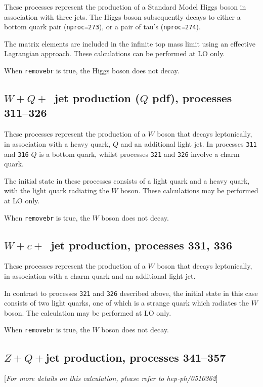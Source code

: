 \documentclass[12pt]{article}
\begin{document}
These processes represent the production of a Standard Model Higgs boson
in association with three jets. The Higgs boson
subsequently decays to either a bottom quark pair ({\tt nproc=273}), 
or a pair of tau's ({\tt nproc=274}).

The matrix elements are included in the infinite top mass limit
using an effective Lagrangian approach. These calculations can be
performed at LO only.

When {\tt removebr} is true, the Higgs boson does not decay.

\subsection{$W+Q+$~jet production ($Q$ pdf), processes 311--326}
\label{subsec:wQj}

These processes represent the production of a $W$
boson that decays leptonically,
in association with a heavy quark, $Q$ and an additional light jet. In
processes {\tt 311} and {\tt 316} $Q$ is a bottom quark, whilst
processes {\tt 321} and {\tt 326} involve a charm quark.

The initial state in these processes consists of a light quark and a heavy 
quark, with the light quark radiating the $W$ boson. These calculations may
be performed at LO only.

When {\tt removebr} is true, the $W$ boson does not decay.

\subsection{$W+c+$~jet production, processes 331, 336}
\label{subsec:wcj}

These processes represent the production of a $W$
boson that decays leptonically,
in association with a charm quark and an additional light jet. 

In contrast to processes {\tt 321} and {\tt 326} described above, the initial
state in this case consists of two light quarks, one of which is a
strange quark which radiates the $W$ boson. The calculation may
be performed at LO only.

When {\tt removebr} is true, the $W$ boson does not decay.

\subsection{$Z+Q+$jet production, processes 341--357}
\label{subsec:ZQj}

\begin{center}
[{\it For more details on this calculation, please refer to hep-ph/0510362}]
\end{center}
\end{document}
